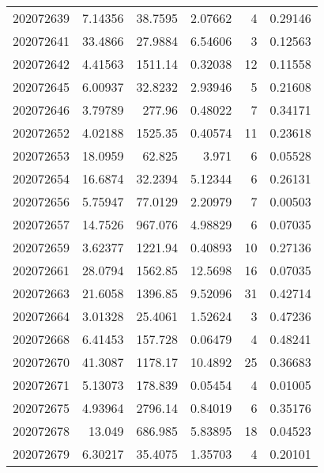 \begin{tabular}{rrrrrr}
 202072639 &          7.14356 &       38.7595 &            2.07662 &           4 & 0.29146 \\
 202072641 &         33.4866  &       27.9884 &            6.54606 &           3 & 0.12563 \\
 202072642 &          4.41563 &     1511.14   &            0.32038 &          12 & 0.11558 \\
 202072645 &          6.00937 &       32.8232 &            2.93946 &           5 & 0.21608 \\
 202072646 &          3.79789 &      277.96   &            0.48022 &           7 & 0.34171 \\
 202072652 &          4.02188 &     1525.35   &            0.40574 &          11 & 0.23618 \\
 202072653 &         18.0959  &       62.825  &            3.971   &           6 & 0.05528 \\
 202072654 &         16.6874  &       32.2394 &            5.12344 &           6 & 0.26131 \\
 202072656 &          5.75947 &       77.0129 &            2.20979 &           7 & 0.00503 \\
 202072657 &         14.7526  &      967.076  &            4.98829 &           6 & 0.07035 \\
 202072659 &          3.62377 &     1221.94   &            0.40893 &          10 & 0.27136 \\
 202072661 &         28.0794  &     1562.85   &           12.5698  &          16 & 0.07035 \\
 202072663 &         21.6058  &     1396.85   &            9.52096 &          31 & 0.42714 \\
 202072664 &          3.01328 &       25.4061 &            1.52624 &           3 & 0.47236 \\
 202072668 &          6.41453 &      157.728  &            0.06479 &           4 & 0.48241 \\
 202072670 &         41.3087  &     1178.17   &           10.4892  &          25 & 0.36683 \\
 202072671 &          5.13073 &      178.839  &            0.05454 &           4 & 0.01005 \\
 202072675 &          4.93964 &     2796.14   &            0.84019 &           6 & 0.35176 \\
 202072678 &         13.049   &      686.985  &            5.83895 &          18 & 0.04523 \\
 202072679 &          6.30217 &       35.4075 &            1.35703 &           4 & 0.20101 \\

\end{tabular}
